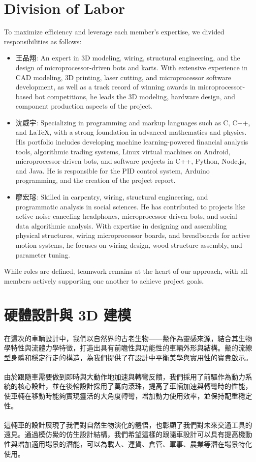 \documentclass[a4paper,12pt]{./article}
\begin{document}
\section{Division of Labor}
To maximize efficiency and leverage each member's expertise, we divided responsibilities as follows:
\begin{itemize}
\item 王品翔: An expert in 3D modeling, wiring, structural engineering, and the design of microprocessor-driven bots and karts. With extensive experience in CAD modeling, 3D printing, laser cutting, and microprocessor software development, as well as a track record of winning awards in microprocessor-based bot competitions, he leads the 3D modeling, hardware design, and component production aspects of the project.
\item 沈威宇: Specializing in programming and markup languages such as C, C++, and LaTeX, with a strong foundation in advanced mathematics and physics. His portfolio includes developing machine learning-powered financial analysis tools, algorithmic trading systems, Linux virtual machines on Android, microprocessor-driven bots, and software projects in C++, Python, Node.js, and Java. He is responsible for the PID control system, Arduino programming, and the creation of the project report.
\item 廖宏璿: Skilled in carpentry, wiring, structural engineering, and programmatic analysis in social sciences. He has contributed to projects like active noise-canceling headphones, microprocessor-driven bots, and social data algorithmic analysis. With expertise in designing and assembling physical structures, wiring microprocessor boards, and breadboards for active motion systems, he focuses on wiring design, wood structure assembly, and parameter tuning.
\end{itemize}
While roles are defined, teamwork remains at the heart of our approach, with all members actively supporting one another to achieve project goals.

\section{硬體設計與 3D 建模}
在這次的車輛設計中，我們以自然界的古老生物——鱟作為靈感來源，結合其生物學特性與流體力學特徵，打造出具有前瞻性與功能性的車輛外形與結構。鱟的流線型身體和穩定行走的構造，為我們提供了在設計中平衡美學與實用性的寶貴啟示。\\\\
由於跟隨車需要做到即時與大動作地加速與轉彎反饋，我們採用了前驅作為動力系統的核心設計，並在後輪設計採用了萬向滾珠，提高了車輛加速與轉彎時的性能，使車輛在移動時能夠實現靈活的大角度轉彎，增加動力使用效率，並保持配重穩定性。\\\\
這輛車的設計展現了我們對自然生物演化的體悟，也彰顯了我們對未來交通工具的遠見。通過模仿鱟的仿生設計結構，我們希望這樣的跟隨車設計可以具有提高機動性與增加適用場景的潛能，可以為載人、運貨、倉管、軍事、農業等潛在場景特化使用。
\end{document}

